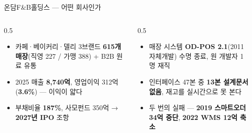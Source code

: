 \begin{frame}{온담F\&B홀딩스 — 어떤 회사인가}
\begin{columns}[T]
\begin{column}{0.5\textwidth}
\begin{itemize}
\item 카페·베이커리·델리 3브랜드 \textbf{615개 매장}(직영 227 / 가맹 388) + B2B 원료 유통
\item 2025 매출 \textbf{8,740억}, 영업이익 312억(\textbf{3.6\%}) — 이익이 얇다
\item 부채비율 \textbf{187\%}, 사모펀드 350억 → \textbf{2027년 IPO} 조항
\end{itemize}
\end{column}
\begin{column}{0.5\textwidth}
\begin{itemize}
\item 매장 시스템 \textbf{OD-POS 2.1}(2011 자체개발) 수명 종료, 원 개발자 1명 재직
\item 인터페이스 47본 중 \textbf{13본 설계문서 없음}, 재고를 실시간으로 못 본다
\item 두 번의 실패 — \textbf{2019 스마트오더 34억 중단}, \textbf{2022 WMS 12억 축소}
\end{itemize}
\end{column}
\end{columns}
\end{frame}

